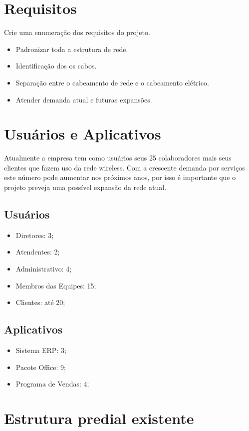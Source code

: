 \documentclass[	DIV=calc,%
paper=a4,%
fontsize=12pt,%
onecolumn]{scrartcl}	 					%
\begin{document}
	\section{Requisitos}
	Crie uma enumeração dos requisitos do projeto.
	\begin{itemize}
		\item Padronizar toda a estrutura de rede.
		\item Identificação dos os cabos.
		\item Separação entre o cabeamento de rede e o cabeamento elétrico.
		\item Atender demanda atual e futuras expansões.				
	\end{itemize}	
	
	\section{Usuários e Aplicativos}
	Atualmente a empresa tem como usuários seus 25 colaboradores mais seus clientes que fazem uso da rede wireless. Com a crescente demanda por serviços este número pode aumentar nos próximos anos, por isso é importante que o projeto preveja uma possível expansão da rede atual.
	
	
	\subsection{Usuários}
	\begin{itemize}
		\item Diretores: 3;
		\item Atendentes: 2;
		\item Administrativo: 4;
		\item Membros das Equipes: 15;
		\item Clientes: até 20;
	\end{itemize}
	\subsection{Aplicativos}
	\begin{itemize}
		\item Sistema ERP: 3;
		\item Pacote Office: 9;
		\item Programa de Vendas: 4;
	\end{itemize}
	
	\section{Estrutura predial existente}
	
\end{document}
